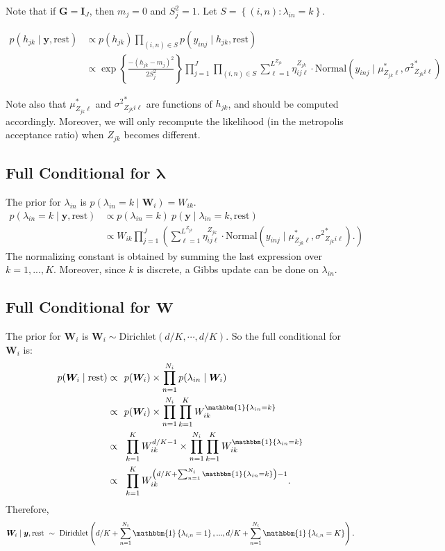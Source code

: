 \documentclass[12pt]{article}
\newcommand{\p}[1]{\left(#1\right)}
\newcommand{\bc}[1]{ \left\{#1\right\} }
\newcommand{\N}{ \mathcal{N} }
\newcommand{\I}{\mathrm{\mathbf{I}}}
\def\N{\text{Normal}}
\def\Dir{\text{Dirichlet}}
\def\lin{\lambda_{in}}
\def\y{\bm{y}}
\def\mus{\mu^*}
\def\sss{{\sigma^2}^*}
\newcommand{\Ind}[1]{\mathbbm{1}\bc{#1}}
\def\rest{\text{rest}}
\begin{document}
Note that if $\bm G = \I_J$, then $m_j=0$ and $S_j^2 = 1$. Let
$S = \bc{(i,n)\colon \lin=k}$.

\begin{align*}
p(h_{jk} \mid \y, \rest)  &\propto p(h_{jk}) \prod_{(i,n) \in S} p(y_{inj} \mid h_{jk}, \rest) \\
%
&\propto
\exp\bc{\frac{-(h_{jk} - m_j)^2}{2S_j^2}}
 \prod_{j=1}^J \prod_{(i,n)\in S}
\sum_{\ell=1}^{L^{Z_{jk}}} \eta^{Z_{jk}}_{ij\ell} \cdot
\N(y_{inj} \mid \mus_{Z_{jk}\ell}, \sss_{Z_{jk}i\ell})
\end{align*}


Note also that $\mus_{Z_{jk}\ell}$ and $\sss_{Z_{jk}i\ell}$ are
functions of $h_{jk}$, and should be computed accordingly. Moreover,
we will only recompute the likelihood (in the metropolis acceptance
ratio) when $Z_{jk}$ becomes different.

\subsection{\texorpdfstring{Full Conditional for
$\bm \lambda$}{Full Conditional for \textbackslash{}bm \textbackslash{}lambda}}\label{full-conditional-for-bm-lambda}

The prior for $\lin$ is $p(\lin = k \mid \bm W_i) = W_{ik}$.
%
\begin{align*}
p(\lin=k\mid \y,\rest) &\propto p(\lin=k) ~ p(\y \mid \lin=k, \rest) \\
&\propto W_{ik}
\prod_{j=1}^J 
\p{
  \sum_{\ell=1}^{L^{Z_{jk}}} \eta^{Z_{jk}}_{ij\ell} \cdot
  \N(y_{inj} \mid 
  \mus_{Z_{jk}\ell}, \sss_{Z_{jk}i\ell}).
}
\end{align*}
%
The normalizing constant is obtained by summing the last expression over
$k = 1,...,K$. Moreover, since $k$ is discrete, a Gibbs update can
be done on $\lin$.

\subsection{\texorpdfstring{Full Conditional for
$\bm W$}{Full Conditional for \textbackslash{}bm W}}\label{full-conditional-for-bm-w}

The prior for $\bm{W}_i$ is $\bm W_i \sim \Dir(d/K, \cdots, d/K)$. So
the full conditional for $\bm{W}_i$ is:
%
\begin{align*}
p(\bm W_i \mid \rest) \propto&~~ p(\bm{W}_i) \times \prod_{n=1}^{N_i} p(\lin \mid \bm{W}_i)\\
\propto&~~ p(\bm{W}_i) \times \prod_{n=1}^{N_i}\prod_{k=1}^K W_{ik}^{\Ind{\lin=k}}\\
\propto&~~ \prod_{k=1}^K W_{ik}^{d/K-1} \times \prod_{n=1}^{N_i}\prod_{k=1}^K W_{ik}^{\Ind{\lin=k}}\\
\propto&~~ \prod_{k=1}^K W_{ik}^{\p{d/K + \sum_{n=1}^{N_i}\Ind{\lin=k}}-1}.
%
\end{align*}
%
Therefore, $$
\bm{W}_i \mid \y,\rest ~\sim~ \Dir\p{d/K+\sum_{n=1}^{N_i}\Ind{\lambda_{i,n}=1},...,d/K+\sum_{n=1}^{N_i}\Ind{\lambda_{i,n}=K}}. 
$$
\end{document}
